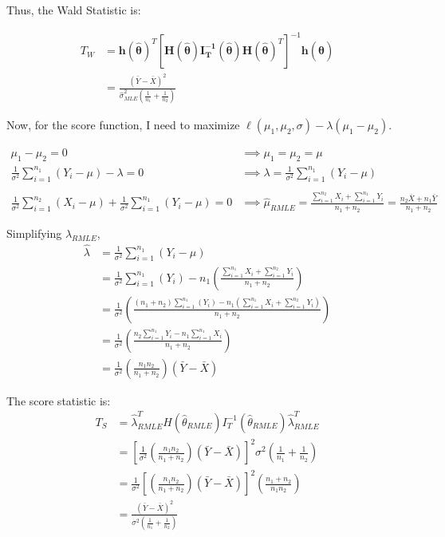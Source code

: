\documentclass[
  letterpaper,
  DIV=11,
  numbers=noendperiod]{scrreprt}
\begin{document}
\newpage

Thus, the Wald Statistic is:

\[\begin{aligned}
T_W &= \mathbf h( \boldsymbol {\hat \theta})^T [\mathbf H(\boldsymbol {\hat \theta}) \mathbf {I_T^{-1}}(\boldsymbol {\hat \theta}) \mathbf H(\boldsymbol {\hat \theta})^T]^{-1}\mathbf h( \boldsymbol {\hat \theta})\\
&= \frac{(\bar Y- \bar X)^2}{\hat \sigma^2_{MLE} \left(\frac 1 {n_1} +\frac 1 {n_2}\right)}
\end{aligned}\]

Now, for the score function, I need to maximize
\(\ell (\mu_1,\mu_2, \sigma) -\lambda(\mu_1-\mu_2)\).

\[\begin{aligned}
\mu_1- \mu_2 = 0 &\implies \mu_1 = \mu_2 = \mu\\
\frac 1 {\sigma^2} \sum_{i=1}^{n_1} (Y_i-\mu) -\lambda =0& \implies \lambda= \frac{1}{\sigma^2} \sum_{i=1}^{n_1} (Y_i-\mu) \\\\
\frac 1 {\sigma^2} \sum_{i=1}^{n_2} (X_i-\mu) + \frac{1}{\sigma^2} \sum_{i=1}^{n_1} (Y_i-\mu)= 0 
&\implies \hat \mu_{RMLE} = \frac{\sum_{i=1}^{n_2} X_i + \sum_{i=1}^{n_1} Y_i}{n_1+n_2} = \frac{n_2 \bar X + n_1 \bar Y}{n_1+n_2}
\end{aligned}\]

Simplifying \(\hat \lambda_{RMLE}\), \[\begin{aligned}
\hat \lambda&= \frac{1}{\sigma^2} \sum_{i=1}^{n_1} (Y_i-\mu) \\
&= \frac{1}{\sigma^2} \sum_{i=1}^{n_1} (Y_i)-n_1 \left(\frac{\sum_{i=1}^{n_1} X_i + \sum_{i=1}^{n_2} Y_i}{n_1+n_2}\right) \\
&= \frac{1}{\sigma^2} \left(\frac{(n_1+n_2)\sum_{i=1}^{n_1} (Y_i)-n_1 \left(\sum_{i=1}^{n_1} X_i + \sum_{i=1}^{n_2} Y_i\right)}{n_1+n_2}\right) \\
&= \frac{1}{\sigma^2} \left(\frac{n_2\sum_{i=1}^{n_1} Y_i-n_1 \sum_{i=1}^{n_1} X_i}{n_1+n_2}\right) \\
&= \frac{1}{\sigma^2} \left(\frac{n_1n_2}{n_1+n_2} \right)(\bar Y - \bar X)
\end{aligned}\]

The score statistic is: \[\begin{aligned}
T_S &= \hat \lambda_{RMLE}^T H(\hat \theta_{RMLE})I_T^{-1}(\hat \theta_{RMLE}) \hat \lambda_{RMLE}^T \\
&= \left[\frac{1}{\sigma^2} \left(\frac{n_1n_2}{n_1+n_2} \right)(\bar Y - \bar X)\right]^2\sigma^2 \left(\frac 1 {n_1} +\frac 1 {n_2}\right) \\
&= \frac{1}{\sigma^2} \left[\left(\frac{n_1n_2}{n_1+n_2} \right)(\bar Y - \bar X)\right]^2 \left(\frac {n_1+n_2} {n_1n_2}\right) \\
&= \frac{(\bar Y - \bar X)^2 }{\sigma^2\left(\frac 1 {n_1} +\frac 1{n_2}\right)}
\end{aligned}\]
\end{document}
